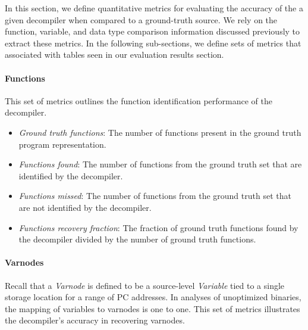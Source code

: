\documentclass[conference]{IEEEtran}
\begin{document}
In this section, we define quantitative metrics for evaluating the accuracy of the a given decompiler when compared to a ground-truth source. We rely on the function, variable, and data type comparison information discussed previously to extract these metrics. In the following sub-sections, we define sets of metrics that associated with tables seen in our evaluation results section.

\paragraph{Functions}

This set of metrics outlines the function identification performance of the decompiler.

\begin{itemize}
    \item \emph{Ground truth functions}: The number of functions present in the ground truth program representation.
    \item \emph{Functions found}: The number of functions from the ground truth set that are identified by the decompiler.
    \item \emph{Functions missed}: The number of functions from the ground truth set that are not identified by the decompiler.
    \item \emph{Functions recovery fraction}: The fraction of ground truth functions found by the decompiler divided by the number of ground truth functions.
\end{itemize}

\paragraph{Varnodes}

Recall that a \emph{Varnode} is defined to be a source-level \emph{Variable} tied to a single storage location for a range of PC addresses. In analyses of unoptimized binaries, the mapping of variables to varnodes is one to one. This set of metrics illustrates the decompiler's accuracy in recovering varnodes.
\end{document}
